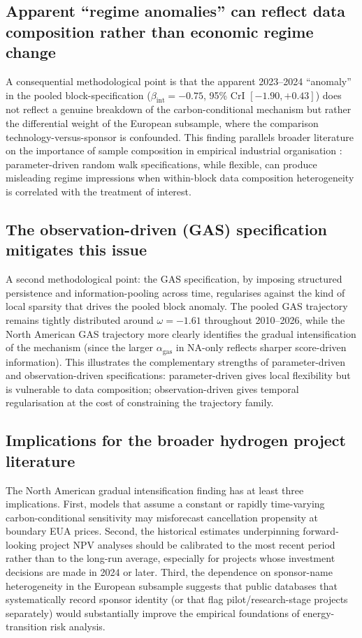 \documentclass[11pt,a4paper]{article}
\newcommand{\bint}{\beta_{\mathrm{int}}}
\begin{document}
\subsection{Apparent ``regime anomalies'' can reflect data composition rather than economic regime change}

A consequential methodological point is that the apparent 2023--2024 ``anomaly'' in the pooled block-specification ($\bint = -0.75$, 95\% CrI $[-1.90, +0.43]$) does not reflect a genuine breakdown of the carbon-conditional mechanism but rather the differential weight of the European subsample, where the comparison technology-versus-sponsor is confounded. This finding parallels broader literature on the importance of sample composition in empirical industrial organisation \citep{durbin2012time}: parameter-driven random walk specifications, while flexible, can produce misleading regime impressions when within-block data composition heterogeneity is correlated with the treatment of interest.

\subsection{The observation-driven (GAS) specification mitigates this issue}

A second methodological point: the GAS specification, by imposing structured persistence and information-pooling across time, regularises against the kind of local sparsity that drives the pooled block anomaly. The pooled GAS trajectory remains tightly distributed around $\omega = -1.61$ throughout 2010--2026, while the North American GAS trajectory more clearly identifies the gradual intensification of the mechanism (since the larger $\alpha_{\mathrm{gas}}$ in NA-only reflects sharper score-driven information). This illustrates the complementary strengths of parameter-driven and observation-driven specifications: parameter-driven gives local flexibility but is vulnerable to data composition; observation-driven gives temporal regularisation at the cost of constraining the trajectory family.

\subsection{Implications for the broader hydrogen project literature}

The North American gradual intensification finding has at least three implications. First, models that assume a constant or rapidly time-varying carbon-conditional sensitivity may misforecast cancellation propensity at boundary EUA prices. Second, the historical estimates underpinning forward-looking project NPV analyses should be calibrated to the most recent period rather than to the long-run average, especially for projects whose investment decisions are made in 2024 or later. Third, the dependence on sponsor-name heterogeneity in the European subsample suggests that public databases that systematically record sponsor identity (or that flag pilot/research-stage projects separately) would substantially improve the empirical foundations of energy-transition risk analysis.
\end{document}

